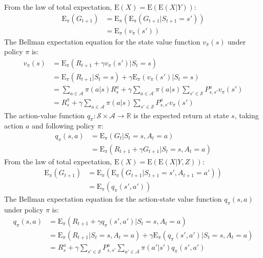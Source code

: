 \documentclass{article}
\begin{document}
From the law of total expectation, $ \text{E}(X) = \text{E}(\text{E}(X|Y)) $:
\begin{equation*}
\begin{split}
\text{E}_{\pi}(G_{t+1}) & = \text{E}_{\pi}(\text{E}_{\pi}(G_{t+1}|S_{t+1} = s')) \\
& = \text{E}_{\pi}(v_{\pi}(s'))
\end{split}
\end{equation*}
The Bellman expectation equation for the state value function $ v_{\pi}(s) $ under policy $\pi $ is:
\begin{equation*}
\begin{split}
v_{\pi}(s) & = \text{E}_{\pi}(R_{t+1} + \gamma v_{\pi}(s') | S_t = s) \\
 & = \text{E}_{\pi}(R_{t+1} | S_t = s) + \gamma \text{E}_{\pi}(v_{\pi}(s') | S_t = s) \\
 & = \sum_{a \in \mathcal{A}} \pi(a | s) R_s^a + \gamma \sum_{a \in \mathcal{A}} \pi(a | s) \sum_{s' \in \mathcal{S}} P_{s,s'}^a v_{\pi}(s') \\
 & = R_s^{\pi} + \gamma \sum_{a \in \mathcal{A}} \pi(a | s) \sum_{s' \in \mathcal{S}} P_{s,s'}^a v_{\pi}(s')
\end{split}
\end{equation*}
The action-value function $ q_{\pi}: \mathcal{S} \times \mathcal{A} \to \mathbb{R} $ is the expected return at state $ s $, taking action $ a $ and following policy $ \pi $:
\begin{equation*}
\begin{split}
q_{\pi}(s,a) & = \text{E}_{\pi}(G_t | S_t = s, A_t = a) \\
 & = \text{E}_{\pi}(R_{t+1} + \gamma G_{t+1} | S_t = s, A_t = a)
\end{split}
\end{equation*}
From the law of total expectation, $ \text{E}(X) = \text{E}(\text{E}(X|Y,Z)) $:
\begin{equation*}
\begin{split}
\text{E}_{\pi}(G_{t+1}) & = \text{E}_{\pi}(\text{E}_{\pi}(G_{t+1}|S_{t+1} = s', A_{t+1} = a')) \\
& = \text{E}_{\pi}(q_{\pi}(s',a'))
\end{split}
\end{equation*}
The Bellman expectation equation for the action-state value function $ q_{\pi}(s,a) $ under policy $\pi $ is:
\begin{equation*}
\begin{split}
q_{\pi}(s,a) & = \text{E}_{\pi}(R_{t+1} + \gamma q_{\pi}(s',a') | S_t = s, A_t = a) \\
 & = \text{E}_{\pi}(R_{t+1} | S_t = s, A_t = a) + \gamma \text{E}_{\pi}(q_{\pi}(s',a') | S_t = s, A_t = a) \\
 & = R_s^a + \gamma \sum_{s' \in \mathcal{S}} P_{s,s'}^a \sum_{a' \in \mathcal{A}} \pi(a' | s') q_{\pi}(s',a')
\end{split}
\end{equation*}
\end{document}
